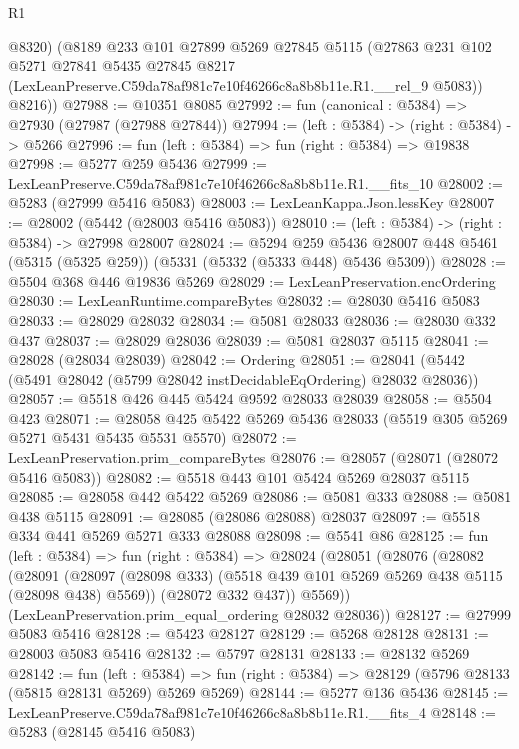 \begin{lexlean}{R1}
\begin{coremodule}
        @8320)
      (@8189
        @233
        @101
        @27899
        @5269
        @27845
        @5115
        (@27863
          @231
          @102
          @5271
          @27841
          @5435
          @27845
          @8217
          (LexLeanPreserve.C59da78af981c7e10f46266c8a8b8b11e.R1.__rel_9 @5083))
        @8216))
@27988 := @10351 @8085
@27992 := fun (canonical : @5384) => @27930 (@27987 (@27988 @27844))
@27994 := (left : @5384) -> (right : @5384) -> @5266
@27996 := fun (left : @5384) => fun (right : @5384) => @19838
@27998 := @5277 @259 @5436
@27999 := LexLeanPreserve.C59da78af981c7e10f46266c8a8b8b11e.R1.__fits_10
@28002 := @5283 (@27999 @5416 @5083)
@28003 := LexLeanKappa.Json.lessKey
@28007 := @28002 (@5442 (@28003 @5416 @5083))
@28010 := (left : @5384) -> (right : @5384) -> @27998 @28007
@28024 := @5294
    @259
    @5436
    @28007
    @448
    @5461
    (@5315 (@5325 @259))
    (@5331 (@5332 (@5333 @448) @5436 @5309))
@28028 := @5504 @368 @446 @19836 @5269
@28029 := LexLeanPreservation.encOrdering
@28030 := LexLeanRuntime.compareBytes
@28032 := @28030 @5416 @5083
@28033 := @28029 @28032
@28034 := @5081 @28033
@28036 := @28030 @332 @437
@28037 := @28029 @28036
@28039 := @5081 @28037 @5115
@28041 := @28028 (@28034 @28039)
@28042 := Ordering
@28051 := @28041 (@5442 (@5491 @28042 (@5799 @28042 instDecidableEqOrdering) @28032 @28036))
@28057 := @5518 @426 @445 @5424 @9592 @28033 @28039
@28058 := @5504 @423
@28071 := @28058 @425 @5422 @5269 @5436 @28033 (@5519 @305 @5269 @5271 @5431 @5435 @5531 @5570)
@28072 := LexLeanPreservation.prim_compareBytes
@28076 := @28057 (@28071 (@28072 @5416 @5083))
@28082 := @5518 @443 @101 @5424 @5269 @28037 @5115
@28085 := @28058 @442 @5422 @5269
@28086 := @5081 @333
@28088 := @5081 @438 @5115
@28091 := @28085 (@28086 @28088) @28037
@28097 := @5518 @334 @441 @5269 @5271 @333 @28088
@28098 := @5541 @86
@28125 := fun (left : @5384) =>
  fun (right : @5384) =>
  @28024
    (@28051
      (@28076
        (@28082
          (@28091
            (@28097 (@28098 @333) (@5518 @439 @101 @5269 @5269 @438 @5115 (@28098 @438) @5569))
            (@28072 @332 @437))
          @5569))
      (LexLeanPreservation.prim_equal_ordering @28032 @28036))
@28127 := @27999 @5083 @5416
@28128 := @5423 @28127
@28129 := @5268 @28128
@28131 := @28003 @5083 @5416
@28132 := @5797 @28131
@28133 := @28132 @5269
@28142 := fun (left : @5384) =>
  fun (right : @5384) => @28129 (@5796 @28133 (@5815 @28131 @5269) @5269 @5269)
@28144 := @5277 @136 @5436
@28145 := LexLeanPreserve.C59da78af981c7e10f46266c8a8b8b11e.R1.__fits_4
@28148 := @5283 (@28145 @5416 @5083)

\end{coremodule}
\end{lexlean}
